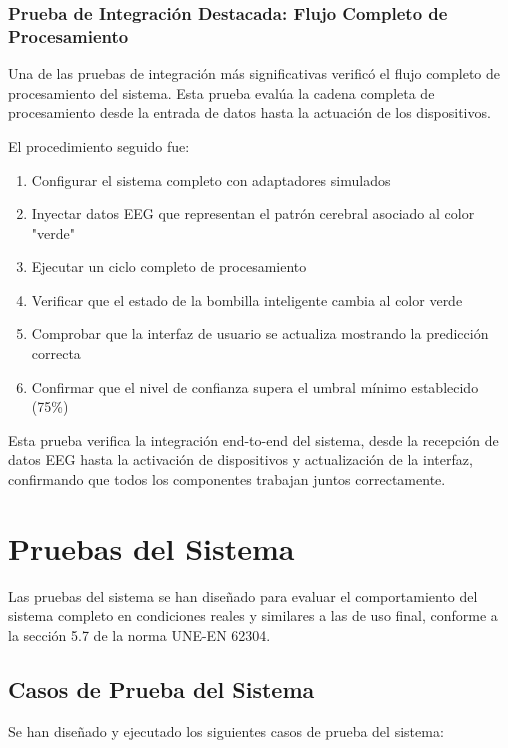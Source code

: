 \subsubsection{Prueba de Integración Destacada: Flujo Completo de Procesamiento}

Una de las pruebas de integración más significativas verificó el flujo completo de procesamiento del sistema. Esta prueba evalúa la cadena completa de procesamiento desde la entrada de datos hasta la actuación de los dispositivos.

El procedimiento seguido fue:
\begin{enumerate}
    \item Configurar el sistema completo con adaptadores simulados
    \item Inyectar datos EEG que representan el patrón cerebral asociado al color "verde"
    \item Ejecutar un ciclo completo de procesamiento
    \item Verificar que el estado de la bombilla inteligente cambia al color verde
    \item Comprobar que la interfaz de usuario se actualiza mostrando la predicción correcta
    \item Confirmar que el nivel de confianza supera el umbral mínimo establecido (75\%)
\end{enumerate}

Esta prueba verifica la integración end-to-end del sistema, desde la recepción de datos EEG hasta la activación de dispositivos y actualización de la interfaz, confirmando que todos los componentes trabajan juntos correctamente.

\section{Pruebas del Sistema}

Las pruebas del sistema se han diseñado para evaluar el comportamiento del sistema completo en condiciones reales y similares a las de uso final, conforme a la sección 5.7 de la norma UNE-EN 62304.

\newpage
\subsection{Casos de Prueba del Sistema}

Se han diseñado y ejecutado los siguientes casos de prueba del sistema:

